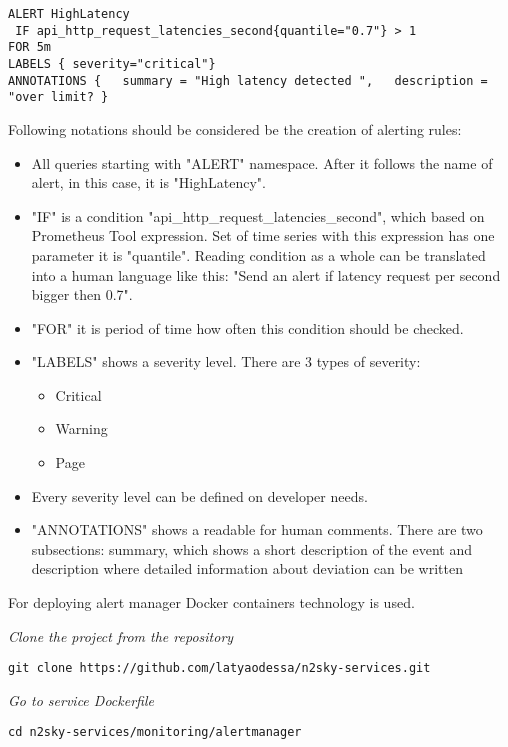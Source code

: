  \begin{lstlisting}
ALERT HighLatency
 IF api_http_request_latencies_second{quantile="0.7"} > 1 
FOR 5m 
LABELS { severity="critical"} 
ANNOTATIONS {   summary = "High latency detected ",   description = "over limit? } 
\end{lstlisting}

Following notations should be considered be the creation of alerting rules:
\begin{itemize}
\item All queries starting with "ALERT" namespace. After it follows the name of alert, in this case, it is "HighLatency".  
\item "IF" is a condition "api\_http\_request\_latencies\_second", which based on Prometheus Tool expression.  Set of time series with this expression has one parameter it is "quantile". Reading condition as a whole can be translated into a human language like this: "Send an alert if latency request per second bigger then 0.7". 
\item "FOR" it is period of time how often this condition should be checked. 
\item "LABELS" shows a severity level. There are 3 types of severity:
\begin{itemize} 
        \item Critical
        \item Warning
        \item Page
     \end{itemize}
\item Every severity level can be defined on developer needs.
\item "ANNOTATIONS" shows a readable for human comments. There are two subsections: summary, which shows a short description of the event and description where detailed information about deviation can be written
\end{itemize}

For deploying alert manager Docker containers technology is used.

\emph{Clone the project from the repository}
 \begin{lstlisting}
git clone https://github.com/latyaodessa/n2sky-services.git 
\end{lstlisting}


\emph{Go to service Dockerfile}
 \begin{lstlisting}
cd n2sky-services/monitoring/alertmanager
\end{lstlisting}

